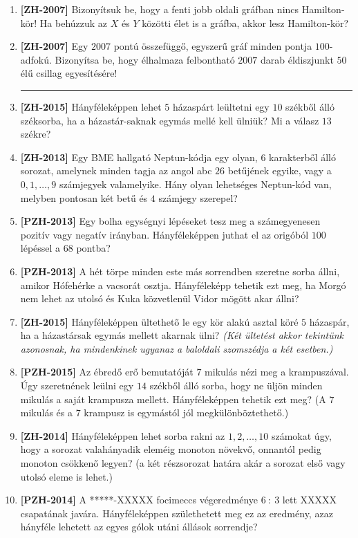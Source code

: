 \documentclass[a4paper, 12pt]{article}
\begin{document}
\begin{enumerate}
        \item \textbf{[ZH-2007]} Bizonyítsuk be, hogy a fenti jobb oldali gráfban nincs Hamilton-kör! Ha behúzzuk az $X$ és $Y$ közötti élet is a gráfba, akkor lesz Hamilton-kör?
        \item \textbf{[ZH-2007]} Egy $2007$ pontú összefüggő, egyszerű gráf minden pontja $100$-adfokú. Bizonyítsa be, hogy élhalmaza felbontható $2007$ darab éldiszjunkt $50$ élű csillag egyesítésére!
        \hrule
        \item \textbf{[ZH-2015]} Hányféleképpen lehet $5$ házaspárt leültetni egy $10$ székből álló széksorba, ha a házastár-saknak egymás mellé kell ülniük? Mi a válasz $13$ székre?
        \item \textbf{[ZH-2013]} Egy BME hallgató Neptun-kódja egy olyan, $6$ karakterből álló sorozat, amelynek minden tagja az angol abc $26$ betűjének egyike, vagy a $0, 1, \ldots, 9$ számjegyek valamelyike. Hány olyan lehetséges Neptun-kód van, melyben pontosan két betű és $4$ számjegy szerepel?
        \item \textbf{[PZH-2013]} Egy bolha egységnyi lépéseket tesz meg a számegyenesen pozitív vagy negatív irányban. Hányféleképpen juthat el az origóból $100$ lépéssel a $68$ pontba?
        \item \textbf{[PZH-2013]} A hét törpe minden este más sorrendben szeretne sorba állni, amikor Hófehérke a vacsorát osztja. Hányféleképp tehetik ezt meg, ha Morgó nem lehet az utolsó és Kuka közvetlenül Vidor mögött akar állni?
        \item \textbf{[ZH-2015]} Hányféleképpen ültethető le egy kör alakú asztal köré $5$ házaspár, ha a házastársak egymás mellett akarnak ülni? \textit{(Két ültetést akkor tekintünk azonosnak, ha mindenkinek ugyanaz a baloldali szomszédja a két esetben.)}
        \item \textbf{[PZH-2015]} Az ébredő erő bemutatóját $7$ mikulás nézi meg a krampuszával. Úgy szeretnének leülni egy $14$ székből álló sorba, hogy ne üljön minden mikulás a saját krampusza mellett. Hányféleképpen tehetik ezt meg? (A $7$ mikulás és a $7$ krampusz is egymástól jól megkülönböztethető.)
        \item \textbf{[ZH-2014]} Hányféleképpen lehet sorba rakni az $1,2,\ldots,10$ számokat úgy, hogy a sorozat valahányadik eleméig monoton növekvő, onnantól pedig monoton csökkenő legyen? (a két részsorozat határa akár a sorozat első vagy utolsó eleme is lehet.)
        \item \textbf{[PZH-2014]} A *****-XXXXX focimeccs végeredménye $6\ :\ 3$ lett XXXXX csapatának javára. Hányféleképpen születhetett meg ez az eredmény, azaz hányféle lehetett az egyes gólok utáni állások sorrendje?

\end{enumerate}
\end{document}
